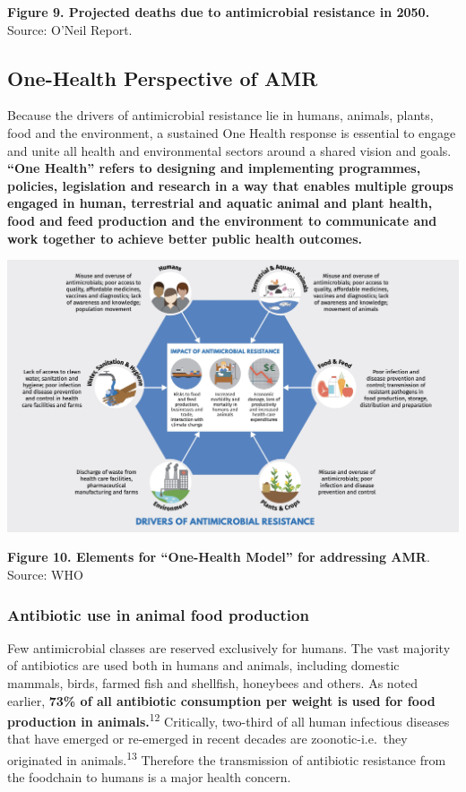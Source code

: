 \documentclass[
  11pt,
  paper=a4,
  ,captions=tableheading
]{scrartcl}
\begin{document}
\textbf{Figure 9. Projected deaths due to antimicrobial resistance in
2050.} Source: O'Neil Report.

\hypertarget{one-health-perspective-of-amr}{%
\subsection*{One-Health Perspective of
AMR}\label{one-health-perspective-of-amr}}

Because the drivers of antimicrobial resistance lie in humans, animals,
plants, food and the environment, a sustained One Health response is
essential to engage and unite all health and environmental sectors
around a shared vision and goals. \textbf{``One Health'' refers to
designing and implementing programmes, policies, legislation and
research in a way that enables multiple groups engaged in human,
terrestrial and aquatic animal and plant health, food and feed
production and the environment to communicate and work together to
achieve better public health outcomes.}

\includegraphics[width=6.25in,height=\textheight]{images/onehealth.jpg}

\textbf{Figure 10. Elements for ``One-Health Model'' for addressing
AMR}. Source: WHO

\hypertarget{antibiotic-use-in-animal-food-production}{%
\subsubsection*{Antibiotic use in animal food
production}\label{antibiotic-use-in-animal-food-production}}

Few antimicrobial classes are reserved exclusively for humans. The vast
majority of antibiotics are used both in humans and animals, including
domestic mammals, birds, farmed fish and shellfish, honeybees and
others. As noted earlier, \textbf{73\% of all antibiotic consumption per
weight is used for food production in animals.}\textsuperscript{12}
Critically, two-third of all human infectious diseases that have emerged
or re-emerged in recent decades are zoonotic-i.e.~they originated in
animals.\textsuperscript{13} Therefore the transmission of antibiotic
resistance from the foodchain to humans is a major health concern.
\end{document}
